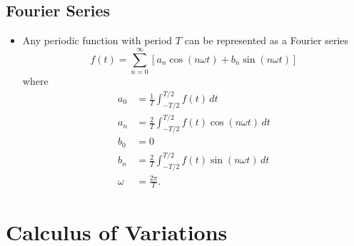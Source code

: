 \documentclass{article}
\begin{document}
\setcounter{subsection}{6}
\subsection{Fourier Series}

\begin{itemize}
  \item Any periodic function with period $T$ can be represented as a Fourier series \[f(t) = \sum_{n = 0}^\infty [a_n \cos (n \omega t) + b_n \sin (n \omega t)]\] where \begin{align*}
          a_0    & = \frac{1}{T} \int_{-T / 2}^{T / 2} f(t) \,d t                   \\
          a_n    & = \frac{2}{T} \int_{-T / 2}^{T / 2} f(t) \cos (n \omega t) \,d t \\
          b_0    & = 0                                                              \\
          b_n    & = \frac{2}{T} \int_{-T / 2}^{T / 2} f(t) \sin (n \omega t) \,d t \\
          \omega & = \frac{2 \pi}{T}.
        \end{align*}
\end{itemize}

\section{Calculus of Variations}
\end{document}
